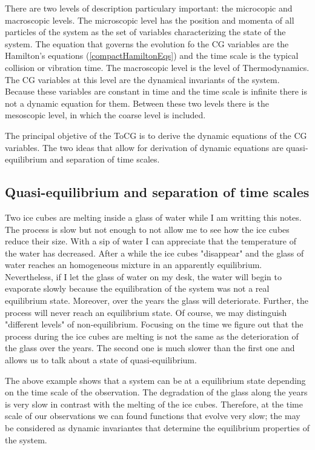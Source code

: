 \documentclass[a4paper,openright,12pt]{book}
\begin{document}
There are two levels of description particulary important: the microcopic and macroscopic levels. The microscopic level has the position and momenta of all particles of the system as the set of variables characterizing the state of the system. The equation that governs the evolution fo the CG variables are the Hamilton's equations (\ref{compactHamiltonEqs}) and the time scale is the typical collision or vibration time. The macroscopic level is the level of Thermodynamics. The CG variables at this level are the dynamical invariants of the system. Because these variables are constant in time and the time scale is infinite there is not a dynamic equation for them. Between these two levels there is the mesoscopic level, in which the coarse level is included.

The principal objetive of the ToCG is to derive the dynamic equations of the CG variables. The two ideas that allow for derivation of dynamic equations are quasi-equilibrium and separation of time scales.

\subsection{Quasi-equilibrium and separation of time scales}
Two ice cubes are melting inside a glass of water while I am writting this notes. 
The process is slow but not enough to not allow me to see how the ice cubes reduce their size. 
With a sip of water I can appreciate that the temperature of the water has decreased. 
After a while the ice cubes "disappear" and the glass of water reaches an homogeneous mixture in an apparently equilibrium. 
Nevertheless, if I let the glass of water on my desk, the water will begin to evaporate slowly because the equilibration of the system was not a real equilibrium state. 
Moreover, over the years the glass will deteriorate. 
Further, the process will never reach an equilibrium state.
Of course, we may distinguish "different levels" of non-equilibrium. 
Focusing on the time we figure out that the process during the ice cubes are melting is not the same as the deterioration of the glass over the years. The second one is much slower than the first one and allows us to talk about a state of quasi-equilibrium. 

The above example shows that a system can be at a equilibrium state depending on the time scale of the observation. The degradation of the glass along the years is very slow in contrast with the melting of the ice cubes. Therefore, at the time scale of our observations we can found functions that evolve very slow; the may be considered as dynamic invariantes that determine the equilibrium properties of the system. 
\end{document}
